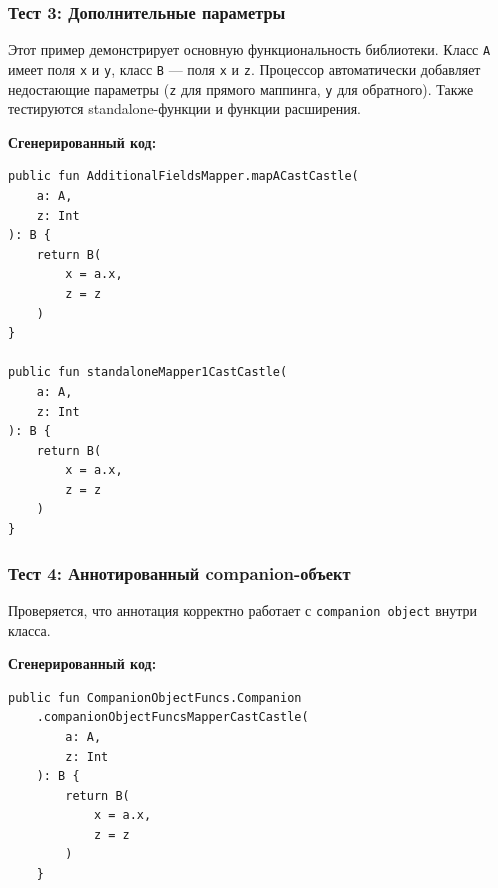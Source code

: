 \subsubsection{Тест 3: Дополнительные параметры}

Этот пример демонстрирует основную функциональность библиотеки. Класс \texttt{A} имеет поля \texttt{x} и \texttt{y}, класс \texttt{B} — поля \texttt{x} и \texttt{z}. Процессор автоматически добавляет недостающие параметры (\texttt{z} для прямого маппинга, \texttt{y} для обратного). Также тестируются standalone-функции и функции расширения.

\textbf{Сгенерированный код:}

\begin{lstlisting}
public fun AdditionalFieldsMapper.mapACastCastle(
    a: A,
    z: Int
): B {
    return B(
        x = a.x,
        z = z
    )
}

public fun standaloneMapper1CastCastle(
    a: A,
    z: Int
): B {
    return B(
        x = a.x,
        z = z
    )
}
\end{lstlisting}

\subsubsection{Тест 4: Аннотированный companion-объект}

Проверяется, что аннотация корректно работает с \texttt{companion object} внутри класса.

\textbf{Сгенерированный код:}

\begin{lstlisting}
public fun CompanionObjectFuncs.Companion
    .companionObjectFuncsMapperCastCastle(
        a: A,
        z: Int
    ): B {
        return B(
            x = a.x,
            z = z
        )
    }
\end{lstlisting}

